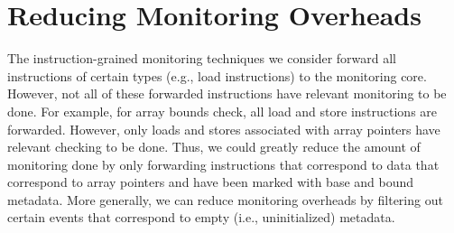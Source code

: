 \section{Reducing Monitoring Overheads}
\label{sec:filter}

The instruction-grained monitoring techniques we consider forward all
instructions of certain types (e.g., load instructions) to the monitoring core.
However, not all of these forwarded instructions have relevant monitoring to be
done. For example, for array bounds check, all load and store instructions are
forwarded. However, only loads and stores associated with array pointers have
relevant checking to be done. Thus, we could greatly reduce the amount of
monitoring done by only forwarding instructions that correspond to data that
correspond to array pointers and have been marked with base and bound metadata.
More generally, we can reduce monitoring overheads by filtering out certain
events that correspond to empty (i.e., uninitialized) metadata.

